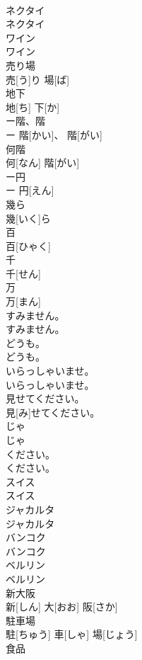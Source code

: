 \documentclass[8pt]{extreport}
\begin{document}
\begin{CJK}{UTF8}{min}
\\	ネクタイ	
\\	ネクタイ		
\\	ワイン	
\\	ワイン		
\\	売り場	
\\	売[う]り 場[ば]		
\\	地下	
\\	地[ち] 下[か]		
\\	ー階、階	
\\	ー 階[かい]、 階[がい]		
\\	何階	
\\	何[なん] 階[がい]		
\\	ー円	
\\	ー 円[えん]		
\\	幾ら	
\\	幾[いく]ら		
\\	百	
\\	百[ひゃく]		
\\	千	
\\	千[せん]		
\\	万	
\\	万[まん]		
\\	すみません。	
\\	すみません。		
\\	どうも。	
\\	どうも。		
\\	いらっしゃいませ。	
\\	いらっしゃいませ。		
\\	[～を]見せてください。	
\\	[～を] 見[み]せてください。		
\\	じゃ	
\\	じゃ		
\\	[～を]ください。	
\\	[～を]ください。		
\\	スイス	
\\	スイス		
\\	ジャカルタ	
\\	ジャカルタ		
\\	バンコク	
\\	バンコク		
\\	ベルリン	
\\	ベルリン		
\\	新大阪	
\\	新[しん] 大[おお] 阪[さか]		
\\	駐車場	
\\	駐[ちゅう] 車[しゃ] 場[じょう]		
\\	食品	

\end{CJK}
\end{document}
